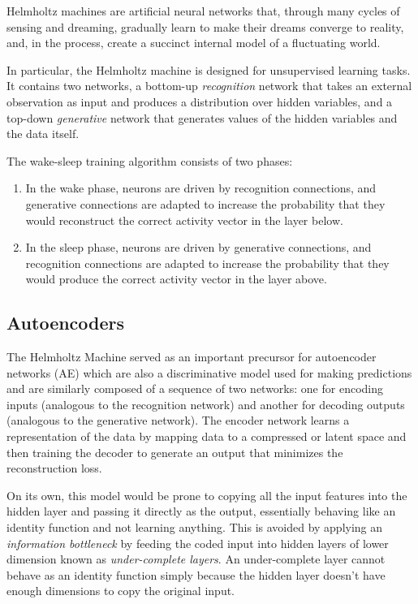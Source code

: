 \documentclass{article}
\begin{document}
Helmholtz machines are artificial neural networks that, through many cycles of sensing and dreaming, gradually learn to make their dreams converge to reality, and, in the process, create a succinct internal model of a fluctuating world. 

In particular, the Helmholtz machine is designed for unsupervised learning tasks. It contains two networks, a bottom-up \textit{recognition} network that takes an external observation as input and produces a distribution over hidden variables, and a top-down \textit{generative} network that generates values of the hidden variables and the data itself. 

The wake-sleep training algorithm consists of two phases:
\begin{enumerate}
    \item In the wake phase, neurons are driven by recognition connections, and generative connections are adapted to increase the probability that they would reconstruct the correct activity vector in the layer below.
    
    \item In the sleep phase, neurons are driven by generative connections, and recognition connections are adapted to increase the probability that they would produce the correct activity vector in the layer above.
\end{enumerate}

\subsection{Autoencoders}
The Helmholtz Machine served as an important precursor for autoencoder networks (AE) which are also a discriminative model used for making predictions and are similarly composed of a sequence of two networks: one for encoding inputs (analogous to the recognition network) and another for decoding outputs (analogous to the generative network). The encoder network learns a representation of the data by mapping data to a compressed or latent space and then training the decoder to generate an output that minimizes the reconstruction loss. 

On its own, this model would be prone to copying all the input features into the hidden layer and passing it directly as the output, essentially behaving like an identity function and not learning anything. This is avoided by applying an \textit{information bottleneck} by feeding the coded input into hidden layers of lower dimension known as \textit{under-complete layers}. An under-complete layer cannot behave as an identity function simply because the hidden layer doesn't have enough dimensions to copy the original input. 
\end{document}
